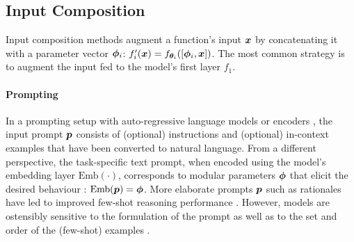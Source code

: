 \documentclass[10pt]{article} %
\begin{document}
\subsection{Input Composition}
\label{sec:nature_modularity:input_composition}

Input composition methods augment a function's input ${\bm{x}}$ by concatenating it with a parameter vector ${\bm{\phi}}_i$: $f_i^\prime({\bm{x}}) = f_{{\bm{\theta}}_i}([{\bm{\phi}}_i, {\bm{x}}])$. The most common strategy is to augment the input fed to the model's first layer $f_1$.

\paragraph*{Prompting} In a prompting setup with auto-regressive language models \citep{brown2020language} or encoders \citep{Schick2021Exploiting,Schick2021ItsNotJustSize}, the input prompt ${\bm{p}}$ consists of (optional) instructions and (optional) in-context examples that have been converted to natural language. From a different perspective, the task-specific text prompt, when encoded using the model's embedding layer $\text{Emb}(\cdot)$, corresponds to modular parameters ${\bm{\phi}}$ that elicit the desired behaviour \citep{gao-etal-2021-making,Liu:2021survey}: $\text{Emb}({\bm{p}}) = {\bm{\phi}}$. More elaborate prompts ${\bm{p}}$ such as rationales have led to improved few-shot reasoning performance \citep{wei2022chain,kojima2022large,Shi2023}. However, models are ostensibly sensitive to the formulation of the prompt as well as to the set and order of the (few-shot) examples \citep{Zhao2021calibrate,lu-etal-2022-fantastically,webson-pavlick-2022-prompt}. 
\end{document}
